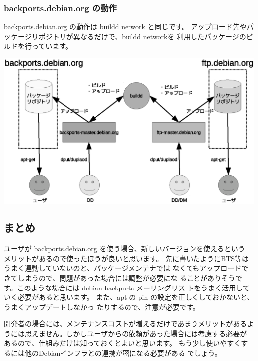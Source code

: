 \documentclass[mingoth,a4paper]{jsarticle}
\begin{document}
\subsubsection{backports.debian.org の動作}
backports.debian.org の動作は buildd network と同じです。
アップロード先やパッケージリポジトリが異なるだけで、buildd networkを
利用したパッケージのビルドを行っています。

\begin{center}
\includegraphics[width=15cm]{image201104/backports-buildd_mono.eps}
\end{center}

\subsection{まとめ}
ユーザが backports.debian.org を使う場合、新しいバージョンを使えるという
メリットがあるので使ったほうが良いと思います。
先に書いたようにBTS等はうまく連動していないのと、パッケージメンテナでは
なくてもアップロードできてしまうので、問題があった場合には調整が必要にな
ることがありそうです。このような場合には debian-backports メーリングリス
トをうまく活用していく必要があると思います。
また、apt の pin の設定を正しくしておかないと、うまくアップデートしなかっ
たりするので、注意が必要です。

開発者の場合には、メンテナンスコストが増えるだけであまりメリットがあるよ
うには思えません。しかしユーザからの依頼があった場合には考慮する必要が
あるので、仕組みだけは知っておくとよいと思います。
もう少し使いやすくするには他のDebianインフラとの連携が密になる必要がある
でしょう。

\end{document}
